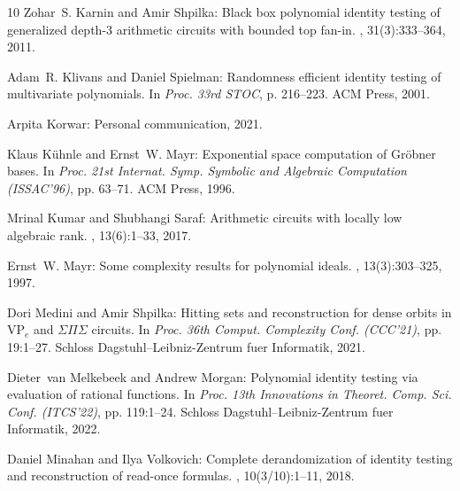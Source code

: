 \begin{thebibliography}{10}
{\sc Zohar~S. Karnin and Amir Shpilka}: Black box polynomial identity testing
  of generalized depth-3 arithmetic circuits with bounded top fan-in.
, 31(3):333–364, 2011.
\newblock [\epfmtdoi{10.1007/s00493-011-2537-3}]

{\sc Adam~R. Klivans and Daniel Spielman}: Randomness efficient identity
  testing of multivariate polynomials.
\newblock In {\em Proc. 33rd STOC}, p. 216–223. ACM Press, 2001.
\newblock [\epfmtdoi{10.1145/380752.380801}]

{\sc Arpita Korwar}: Personal communication, 2021.

{\sc Klaus K{\"{u}}hnle and Ernst~W. Mayr}: Exponential space computation of
  {Gr{\"{o}}bner} bases.
\newblock In {\em Proc. 21st Internat. Symp. Symbolic and Algebraic Computation
  (ISSAC'96)}, pp. 63--71. ACM Press, 1996.
\newblock [\epfmtdoi{10.1145/236869.236900}]

{\sc Mrinal Kumar and Shubhangi Saraf}: Arithmetic circuits with locally low
  algebraic rank.
, 13(6):1--33, 2017.

{\sc Ernst~W. Mayr}: Some complexity results for polynomial ideals.
, 13(3):303--325, 1997.

{\sc Dori Medini and Amir Shpilka}: Hitting sets and reconstruction for dense
  orbits in $\mathrm{VP}_{e}$ and ${\Sigma\Pi\Sigma}$ circuits.
\newblock In {\em Proc. 36th Comput. Complexity Conf. (CCC'21)}, pp. 19:1--27.
  Schloss Dagstuhl--Leibniz-Zentrum fuer Informatik, 2021.

{\sc Dieter~van Melkebeek and Andrew Morgan}: Polynomial identity testing via
  evaluation of rational functions.
\newblock In {\em Proc. 13th Innovations in Theoret. Comp. Sci. Conf.
  (ITCS'22)}, pp. 119:1--24. Schloss Dagstuhl--Leibniz-Zentrum fuer Informatik,
  2022.

{\sc Daniel Minahan and Ilya Volkovich}: Complete derandomization of identity
  testing and reconstruction of read-once formulas.
, 10(3/10):1--11, 2018.
\newblock [\epfmtdoi{10.1145/3196836}]


\end{thebibliography}
